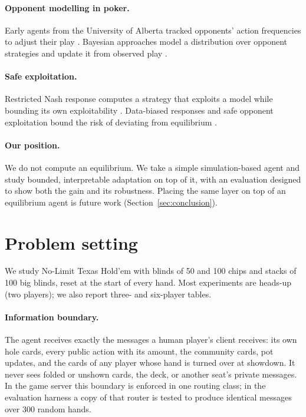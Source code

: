 \paragraph{Opponent modelling in poker.} Early agents from the University of Alberta tracked
opponents' action frequencies to adjust their play \citep{billings1998,billings2002}.
Bayesian approaches model a distribution over opponent strategies and update it from
observed play \citep{southey2005}.

\paragraph{Safe exploitation.} Restricted Nash response computes a strategy that exploits a
model while bounding its own exploitability \citep{johanson2008}. Data-biased responses and
safe opponent exploitation bound the risk of deviating from equilibrium
\citep{ganzfried2011,ganzfried2015}.

\paragraph{Our position.} We do not compute an equilibrium. We take a simple
simulation-based agent and study bounded, interpretable adaptation on top of it, with an
evaluation designed to show both the gain and its robustness. Placing the same layer on top
of an equilibrium agent is future work (Section~\ref{sec:conclusion}).

\section{Problem setting}

We study No-Limit Texas Hold'em with blinds of 50 and 100 chips and stacks of 100 big blinds,
reset at the start of every hand. Most experiments are heads-up (two players); we also report
three- and six-player tables.

\paragraph{Information boundary.} The agent receives exactly the messages a human player's
client receives: its own hole cards, every public action with its amount, the community
cards, pot updates, and the cards of any player whose hand is turned over at showdown. It
never sees folded or unshown cards, the deck, or another seat's private messages. In the
game server this boundary is enforced in one routing class; in the evaluation harness a copy
of that router is tested to produce identical messages over 300 random hands.

